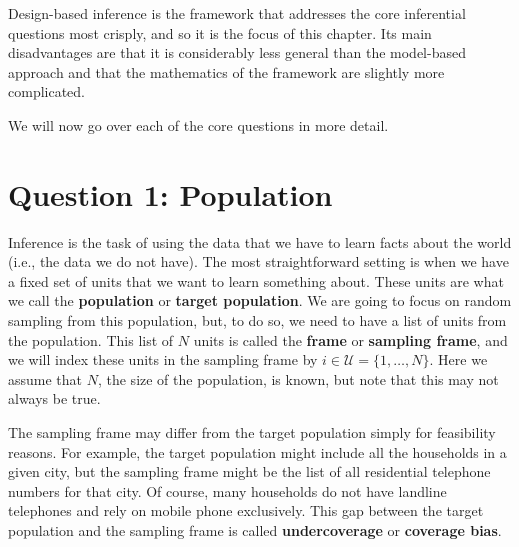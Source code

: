 \documentclass[
  13pt,
  letterpaper,
  DIV=11,
  numbers=noendperiod]{scrreprt}
\theoremstyle{plain}
\theoremstyle{plain}
\theoremstyle{definition}
\theoremstyle{definition}
\theoremstyle{remark}
\begin{document}
Design-based inference is the framework that addresses the core
inferential questions most crisply, and so it is the focus of this
chapter. Its main disadvantages are that it is considerably less general
than the model-based approach and that the mathematics of the framework
are slightly more complicated.

We will now go over each of the core questions in more detail.

\section{Question 1: Population}\label{question-1-population}

Inference is the task of using the data that we have to learn facts
about the world (i.e., the data we do not have). The most
straightforward setting is when we have a fixed set of units that we
want to learn something about. These units are what we call the
\textbf{population} or \textbf{target population}. We are going to focus
on random sampling from this population, but, to do so, we need to have
a list of units from the population. This list of \(N\) units is called
the \textbf{frame} or \textbf{sampling frame}, and we will index these
units in the sampling frame by \(i \in \mathcal{U} = \{1, \ldots, N\}\).
Here we assume that \(N\), the size of the population, is known, but
note that this may not always be true.

The sampling frame may differ from the target population simply for
feasibility reasons. For example, the target population might include
all the households in a given city, but the sampling frame might be the
list of all residential telephone numbers for that city. Of course, many
households do not have landline telephones and rely on mobile phone
exclusively. This gap between the target population and the sampling
frame is called \textbf{undercoverage} or \textbf{coverage bias}.
\end{document}
